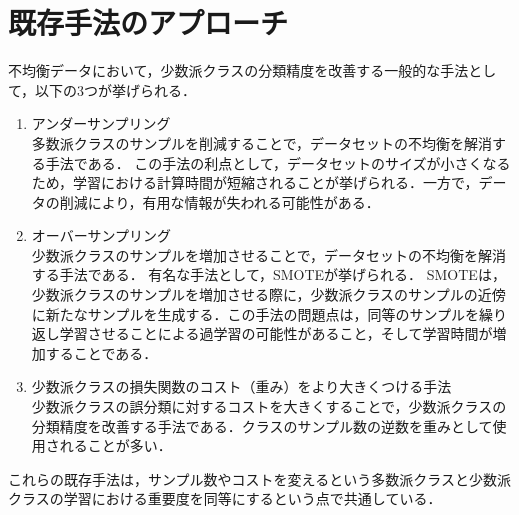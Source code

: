 \section{既存手法のアプローチ}

不均衡データにおいて，少数派クラスの分類精度を改善する一般的な手法として，以下の3つが挙げられる．

\begin{enumerate}
    \item アンダーサンプリング \\
    多数派クラスのサンプルを削減することで，データセットの不均衡を解消する手法である．
    この手法の利点として，データセットのサイズが小さくなるため，学習における計算時間が短縮されることが挙げられる．一方で，データの削減により，有用な情報が失われる可能性がある．
    \item オーバーサンプリング\\
    少数派クラスのサンプルを増加させることで，データセットの不均衡を解消する手法である．
    有名な手法として，SMOTE\cite{smote}が挙げられる．
    SMOTEは，少数派クラスのサンプルを増加させる際に，少数派クラスのサンプルの近傍に新たなサンプルを生成する．この手法の問題点は，同等のサンプルを繰り返し学習させることによる過学習の可能性があること，そして学習時間が増加することである．
    \item 少数派クラスの損失関数のコスト（重み）をより大きくつける手法\\
    少数派クラスの誤分類に対するコストを大きくすることで，少数派クラスの分類精度を改善する手法である．クラスのサンプル数の逆数を重みとして使用されることが多い．
\end{enumerate}

これらの既存手法は，サンプル数やコストを変えるという多数派クラスと少数派クラスの学習における重要度を同等にするという点で共通している．
